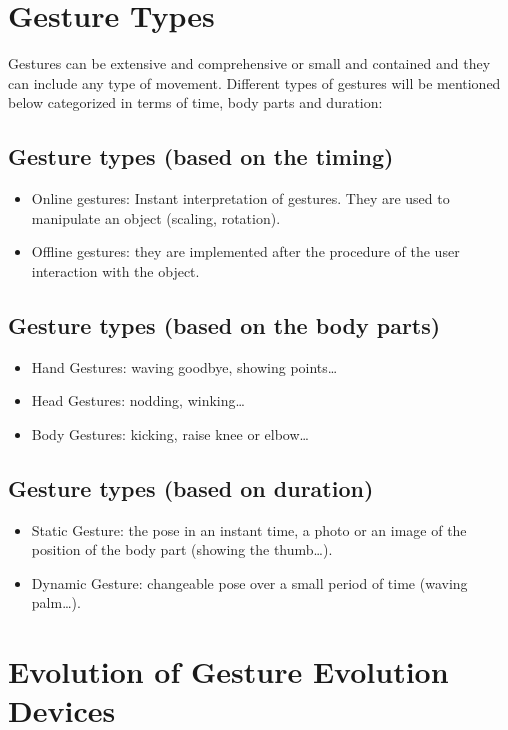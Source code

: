 \documentclass[12pt]{book}
\begin{document}
\chapter{Gesture Types}\label{ch:ch1}
Gestures can be extensive and comprehensive or small and contained and they can include any type of movement. Different types of gestures will be mentioned below categorized in terms of time, body parts and duration: 

\section{Gesture types (based on the timing)}\label{s:sec1}
\begin{itemize}
    \item Online gestures: Instant interpretation of gestures. They are used to    manipulate an object (scaling, rotation). 
    \item Offline gestures: they are implemented after the procedure of the user interaction with the object. 
\end{itemize}
    
\section{Gesture types (based on the body parts)}\label{s:sec2}
\begin{itemize}
    \item Hand Gestures: waving goodbye, showing points… 
    \item Head Gestures: nodding, winking… 
    \item Body Gestures: kicking, raise knee or elbow… 
\end{itemize}    

\section{Gesture types (based on duration)}\label{s:sec3}
\begin{itemize}
    \item Static Gesture: the pose in an instant time, a photo or an image of the position of the body part (showing the thumb…).
    \item Dynamic Gesture: changeable pose over a small period of time (waving palm…). 
\end{itemize}

\chapter{Evolution of Gesture Evolution Devices}\label{ch:ch2}
\end{document}
